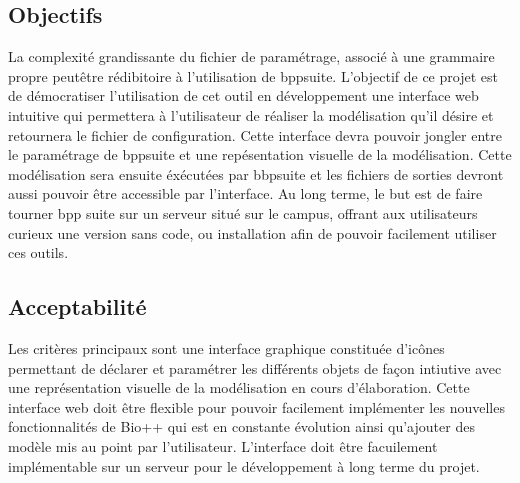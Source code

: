 	
\subsection{Objectifs}
	La complexité grandissante du fichier de paramétrage, associé à une grammaire propre peutêtre rédibitoire à l'utilisation de bppsuite. L'objectif de ce projet est de démocratiser l'utilisation de cet outil en développement une interface web intuitive qui permettera à l'utilisateur de réaliser la modélisation qu'il désire et retournera le fichier de configuration. Cette interface devra pouvoir jongler entre le paramétrage de bppsuite et une repésentation visuelle de la modélisation. Cette modélisation sera ensuite éxécutées par bbpsuite et les fichiers de sorties devront aussi pouvoir être accessible par l'interface. Au long terme, le but est de faire tourner bpp suite sur un serveur situé sur le campus, offrant aux utilisateurs curieux une version sans code, ou installation afin de pouvoir facilement utiliser ces outils.
	
\subsection{Acceptabilité}
	Les critères principaux sont une interface graphique constituée d'icônes permettant de déclarer et paramétrer les différents objets de façon intiutive avec une représentation visuelle de la modélisation en cours d'élaboration. Cette interface web doit être flexible pour pouvoir facilement implémenter les nouvelles fonctionnalités de Bio++ qui est en constante évolution ainsi qu'ajouter des modèle mis au point par l'utilisateur. L'interface doit être facuilement implémentable sur un serveur pour le développement à long terme du projet.
	
	
